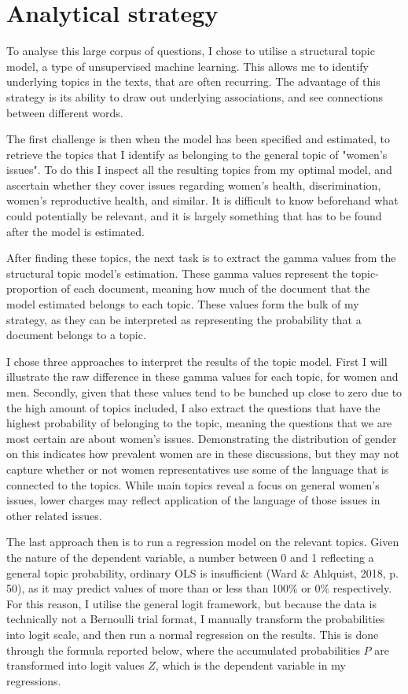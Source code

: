 \documentclass[12pt]{article}
\begin{document}
	\section{Analytical strategy}
	
	To analyse this large corpus of questions, I chose to utilise a structural topic model, a type of unsupervised machine learning. This allows me to identify underlying topics in the texts, that are often recurring. The advantage of this strategy is its ability to draw out underlying associations, and see connections between different words. 
	
	The first challenge is then when the model has been specified and estimated, to retrieve the topics that I identify as belonging to the general topic of "women's issues". To do this I inspect all the resulting topics from my optimal model, and ascertain whether they cover issues regarding women's health, discrimination, women's reproductive health, and similar. It is difficult to know beforehand what could potentially be relevant, and it is largely something that has to be found after the model is estimated.
	
	After finding these topics, the next task is to extract the gamma values from the structural topic model's estimation. These gamma values represent the topic-proportion of each document, meaning how much of the document that the model estimated belongs to each topic. These values form the bulk of my strategy, as they can be interpreted as representing the probability that a document belongs to a topic. 
	
	I chose three approaches to interpret the results of the topic model. First I will illustrate the raw difference in these gamma values for each topic, for women and men. Secondly, given that these values tend to be bunched up close to zero due to the high amount of topics included, I also extract the questions that have the highest probability of belonging to the topic, meaning the questions that we are most certain are about women's issues. Demonstrating the distribution of gender on this indicates how prevalent women are in these discussions, but they may not capture whether or not women representatives use some of the language that is connected to the topics. While main topics reveal a focus on general women's issues, lower charges may reflect application of the language of those issues in other related issues. 
	
	The last approach then is to run a regression model on the relevant topics. Given the nature of the dependent variable, a number between 0 and 1 reflecting a general topic probability, ordinary OLS is insufficient (Ward \& Ahlquist, 2018, p. 50), as it may predict values of more than or less than 100\% or 0\% respectively. For this reason, I utilise the general logit framework, but because the data is technically not a Bernoulli trial format, I manually transform the probabilities into logit scale, and then run a normal regression on the results. This is done through the formula reported below, where the accumulated probabilities $P$ are transformed into logit values $Z$, which is the dependent variable in my regressions. 
	
\end{document}
